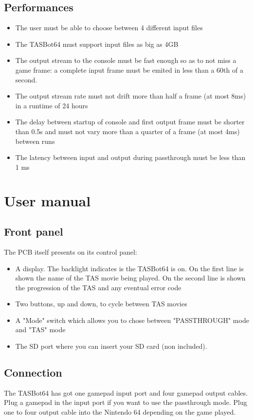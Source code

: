 \documentclass[a4paper,oneside,12pt]{article}
\begin{document}
\subsection{Performances}
\begin{itemize}
\item The user must be able to choose between 4 different input files
\item The TASBot64 must support input files as big as 4GB
\item The output stream to the console must be fast enough so as to not miss a
  game frame: a complete input frame must be emited in less than a 60th of a
  second.
\item The output stream rate must not drift more than half a frame (at most 8ms)
  in a runtime of 24 hours
\item The delay between startup of console and first output frame must be
  shorter than 0.5s and must not vary more than a quarter of a frame (at most
  4ms) between runs
\item The latency between input and output during passthrough must be less than
  1 ms
\end{itemize}

\section{User manual}
\subsection{Front panel}
The PCB itself presents on its control panel:
\begin{itemize}
\item A display. The backlight indicates is the TASBot64 is on. On the first line
  is shown the name of the TAS movie being played. On the second line is shown
  the progression of the TAS and any eventual error code
\item Two buttons, up and down, to cycle between TAS movies
\item A "Mode" switch which allows you to chose between "PASSTHROUGH" mode and
  "TAS" mode
\item The SD port where you can insert your SD card (non included).
\end{itemize}

\subsection{Connection}
The TASBot64 has got one gamepad input port and four gamepad output cables. Plug
a gamepad in the input port if you want to use the passthrough mode. Plug one to
four output cable into the Nintendo 64 depending on the game played.
\end{document}
